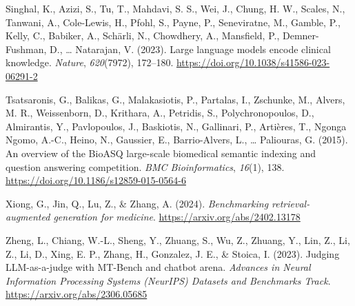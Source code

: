 \documentclass[
  american,
  a4paper,
]{article}
\newlength{\cslhangindent}
\newenvironment{CSLReferences}[2] %
 {\begin{list}{}{%
  \setlength{\itemindent}{0pt}
  \setlength{\leftmargin}{0pt}
  \setlength{\parsep}{0pt}
  \ifodd #1
   \setlength{\leftmargin}{\cslhangindent}
   \setlength{\itemindent}{-1\cslhangindent}
  \fi
  \setlength{\itemsep}{#2\baselineskip}}}
 {\end{list}}
\begin{document}
\begin{CSLReferences}{1}{0}
Singhal, K., Azizi, S., Tu, T., Mahdavi, S. S., Wei, J., Chung, H. W.,
Scales, N., Tanwani, A., Cole-Lewis, H., Pfohl, S., Payne, P.,
Seneviratne, M., Gamble, P., Kelly, C., Babiker, A., Schärli, N.,
Chowdhery, A., Mansfield, P., Demner-Fushman, D., \ldots{} Natarajan, V.
(2023). Large language models encode clinical knowledge. \emph{Nature},
\emph{620}(7972), 172--180.
\url{https://doi.org/10.1038/s41586-023-06291-2}

Tsatsaronis, G., Balikas, G., Malakasiotis, P., Partalas, I., Zschunke,
M., Alvers, M. R., Weissenborn, D., Krithara, A., Petridis, S.,
Polychronopoulos, D., Almirantis, Y., Pavlopoulos, J., Baskiotis, N.,
Gallinari, P., Artières, T., Ngonga Ngomo, A.-C., Heino, N., Gaussier,
E., Barrio-Alvers, L., \ldots{} Paliouras, G. (2015). An overview of the
{BioASQ} large-scale biomedical semantic indexing and question answering
competition. \emph{BMC Bioinformatics}, \emph{16}(1), 138.
\url{https://doi.org/10.1186/s12859-015-0564-6}

Xiong, G., Jin, Q., Lu, Z., \& Zhang, A. (2024). \emph{Benchmarking
retrieval-augmented generation for medicine}.
\url{https://arxiv.org/abs/2402.13178}

Zheng, L., Chiang, W.-L., Sheng, Y., Zhuang, S., Wu, Z., Zhuang, Y.,
Lin, Z., Li, Z., Li, D., Xing, E. P., Zhang, H., Gonzalez, J. E., \&
Stoica, I. (2023). Judging {LLM}-as-a-judge with {MT-Bench} and chatbot
arena. \emph{Advances in Neural Information Processing Systems (NeurIPS)
Datasets and Benchmarks Track}. \url{https://arxiv.org/abs/2306.05685}

\end{CSLReferences}
\end{document}
